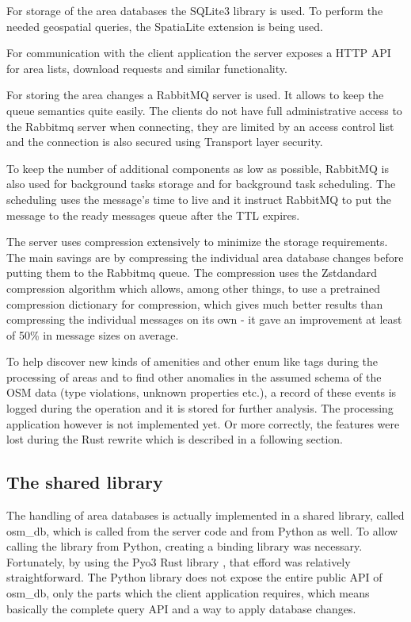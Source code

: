 \documentclass[nolof,digital]{fithesis3}
\begin{document}
For storage of the area databases the SQLite3 library \parencite{sqlite} is used. To perform the needed geospatial queries, the SpatiaLite extension \parencite{spatialite} is being used.

For communication with the client application the server exposes a HTTP API for area lists, download requests and similar functionality. 

For storing the area changes a RabbitMQ \parencite{rabbitmq} server is used. It allows to keep the queue semantics quite easily. The clients do not have full administrative access to the Rabbitmq server when connecting, they are limited by an access control list and the connection is also secured using Transport layer security.

To keep the number of additional components as low as possible, RabbitMQ is also used for background tasks storage and for background task scheduling. The scheduling uses the message's time to live and it instruct RabbitMQ to put the message to the ready messages queue after the TTL expires.

The server uses compression extensively to minimize the storage requirements. The main savings are by compressing the individual area database changes before putting them to the Rabbitmq queue. The compression uses the Zstdandard compression algorithm \parencite{zstd} which allows, among other things, to use a pretrained compression dictionary for compression, which gives much better results than compressing the individual messages on its own - it gave an improvement at least of 50\% in message sizes on average.

To help discover new kinds of amenities and other enum like tags during the processing of areas and to find other anomalies in the assumed schema of the OSM data (type violations, unknown properties etc.), a record of these events is logged during the operation and it is stored for further analysis. The processing application however is not implemented yet. Or more correctly, the features were lost during the Rust rewrite which is described in a following section.
\subsection{The shared library}
The handling of area databases is actually implemented in a shared library, called osm\_db, which is called from the server code and from Python as well. To allow calling the library from Python, creating a binding library was necessary. Fortunately, by using the Pyo3 Rust library \parencite{pyo3}, that efford was relatively straightforward. The Python library does not expose the entire public API of osm\_db, only the parts which the client application requires, which means basically the complete query API and a way to apply database changes.
\end{document}
